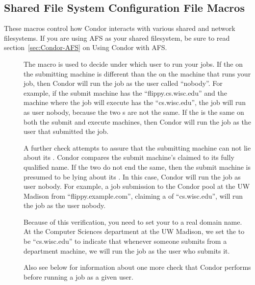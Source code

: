 \subsection{\label{sec:Shared-Filesystem-Config-File-Entries}
Shared File System Configuration File Macros}

These macros control how Condor interacts with various shared and
network filesystems.  If you are using AFS as your shared filesystem,
be sure to read section~\ref{sec:Condor-AFS} on Using Condor with
AFS.
\begin{description}

\item[] \label{param:UidDomain}
The  macro
is used to decide under which user to run your jobs.
If the 
on the submitting machine is different than
the 
on the machine that runs your job, then Condor will run
the job as the user called ``nobody''.
For example, if the submit machine has
the 
``flippy.cs.wisc.edu'' and the machine where the job will execute
has the 
``cs.wisc.edu'', the job will run as user nobody, because
the two s are not the same.
If the 
is the same on both the submit and execute machines,
then Condor will run the job as the user that submitted the job.

A further check attempts to assure that the submitting
machine can not lie about its .
Condor compares the 
submit machine's claimed 
to its fully qualified name.
If the two do not end the same, then the submit machine
is presumed to be lying about its .
In this case, Condor will run the job as user nobody.
For example, a job submission to the Condor pool at the UW Madison
from ``flippy.example.com'', claiming a 
of ``cs.wisc.edu'',
will run the job as the user nobody.

Because of this verification, you need to set your
to a real domain name. At the Computer Sciences department
at the UW Madison, we set the 
to be ``cs.wisc.edu'' to
indicate that whenever someone submits from a department machine, we
will run the job as the user who submits it.

Also see 
below for information about one more check
that Condor performs before running a job as a given user.


\end{description}
